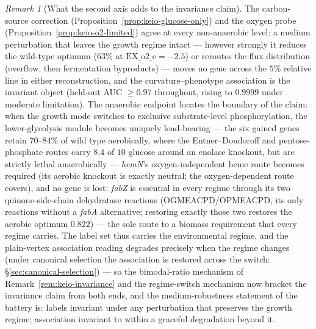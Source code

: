 \documentclass[11pt,a4paper]{article}
\theoremstyle{plain}
\theoremstyle{definition}
\theoremstyle{remark}
\newtheorem{remark}[theorem]{Remark}
\begin{document}
\begin{remark}[What the second axis adds to the invariance claim]
\label{rem:keio-o2-invariance}
The carbon-source correction
(Proposition~\ref{prop:keio-glucose-only}) and the oxygen probe
(Proposition~\ref{prop:keio-o2-limited}) agree at every
non-anaerobic level: a medium perturbation that leaves the growth
regime intact --- however strongly it reduces the wild-type optimum
($63\%$ at $\mathrm{EX\_o2\_e}=-2.5$) or reroutes the flux
distribution (overflow, then fermentation byproducts) --- moves no
gene across the $5\%$ relative line in either reconstruction, and
the curvature--phenotype association is the invariant object
(held-out AUC $\ge 0.97$ throughout, rising to $0.9999$ under
moderate limitation). The anaerobic endpoint locates the boundary of
the claim: when the growth mode switches to exclusive
substrate-level phosphorylation, the lower-glycolysis module becomes
uniquely load-bearing --- the six gained genes retain $70$--$84\%$
of wild type aerobically, where the Entner--Doudoroff and
pentose-phosphate routes carry $8.4$ of $10$ glucose around an
enolase knockout, but are strictly lethal anaerobically ---
\emph{hemN}'s oxygen-independent heme route becomes required (its
aerobic knockout is exactly neutral; the oxygen-dependent route
covers), and no gene is lost: \emph{fabZ} is essential in every regime through its two
quinone-side-chain dehydratase reactions (OGMEACPD/OPMEACPD, its
only reactions without a \emph{fabA} alternative; restoring exactly
those two restores the aerobic optimum $0.822$) --- the sole route
to a biomass requirement that every regime carries. The label set
thus carries the environmental regime, and the plain-vertex
association reading degrades precisely when the regime changes
(under canonical selection the association is restored across the
switch: \S\ref{sec:canonical-selection}) --- so the bimodal-ratio
mechanism of
Remark~\ref{rem:keio-invariance} and the regime-switch mechanism
now bracket the invariance claim from both ends, and the
medium-robustness statement of the battery is: labels invariant
under any perturbation that preserves the growth regime;
association invariant to within a graceful degradation beyond it.
\end{remark}
\end{document}
